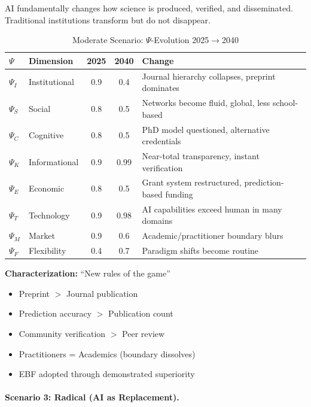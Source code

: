 AI fundamentally changes how science is produced, verified, and disseminated.
Traditional institutions transform but do not disappear.

\begin{table}[htbp]
\centering
\caption{Moderate Scenario: $\Psi$-Evolution 2025$\to$2040}
\label{tab:scenario-moderate}
\renewcommand{\arraystretch}{1.2}
\small
\begin{tabular}{@{}llccp{5cm}@{}}
\toprule
$\Psi$ & \textbf{Dimension} & \textbf{2025} & \textbf{2040} & \textbf{Change} \\
\midrule
$\Psi_I$ & Institutional & 0.9 & 0.4 & Journal hierarchy collapses, preprint dominates \\
$\Psi_S$ & Social & 0.8 & 0.5 & Networks become fluid, global, less school-based \\
$\Psi_C$ & Cognitive & 0.8 & 0.5 & PhD model questioned, alternative credentials \\
$\Psi_K$ & Informational & 0.9 & 0.99 & Near-total transparency, instant verification \\
$\Psi_E$ & Economic & 0.8 & 0.5 & Grant system restructured, prediction-based funding \\
$\Psi_T$ & Technology & 0.9 & 0.98 & AI capabilities exceed human in many domains \\
$\Psi_M$ & Market & 0.9 & 0.6 & Academic/practitioner boundary blurs \\
$\Psi_F$ & Flexibility & 0.4 & 0.7 & Paradigm shifts become routine \\
\bottomrule
\end{tabular}
\end{table}

\textbf{Characterization:} ``New rules of the game''
\begin{itemize}[nosep]
    \item Preprint $>$ Journal publication
    \item Prediction accuracy $>$ Publication count
    \item Community verification $>$ Peer review
    \item Practitioners = Academics (boundary dissolves)
    \item EBF adopted through demonstrated superiority
\end{itemize}

\paragraph{Scenario 3: Radical (AI as Replacement).}

